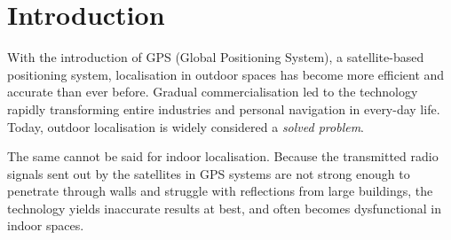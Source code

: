 \documentclass[a4paper]{article}
\begin{document}
  
  \newpage

  \tableofcontents
  \newpage


  \begin{abstract} %
    \lipsum[1]
  \end{abstract}

  \section{Introduction}
  \label{sec:introduction}

  With the introduction of GPS (Global Positioning System), a satellite-based
  positioning system, localisation in outdoor spaces has become more efficient
  and accurate than ever before. Gradual commercialisation led to the technology
  rapidly transforming entire industries and personal navigation in every-day
  life. Today, outdoor localisation is widely considered a \textit{solved
  problem}.

  The same cannot be said for indoor localisation. Because the transmitted radio
  signals sent out by the satellites in GPS systems are not strong enough to
  penetrate through walls and struggle with reflections from large buildings,
  the technology yields inaccurate results at best, and often becomes
  dysfunctional in indoor spaces.
\end{document}
